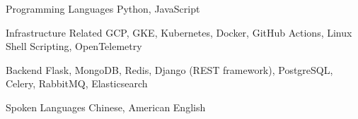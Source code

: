 

\begin{cvskills}

  \cvskill
    {Programming Languages} %
    {Python, JavaScript} %

  \cvskill
    {Infrastructure Related} %
    {GCP, GKE, Kubernetes, Docker, GitHub Actions, Linux Shell Scripting, OpenTelemetry} %

  \cvskill
    {Backend} %
    {Flask, MongoDB, Redis, Django (REST framework), PostgreSQL, Celery, RabbitMQ, Elasticsearch} %


  \cvskill
    {Spoken Languages} %
    {Chinese, American English} %

\end{cvskills}
